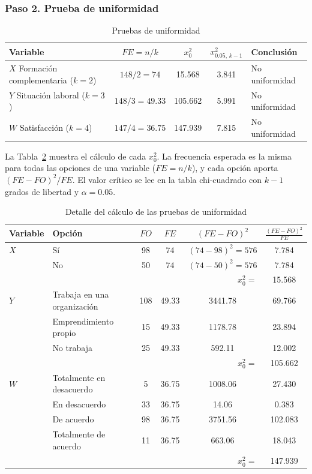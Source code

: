 \documentclass[12pt, a4paper]{article}
\newenvironment{mitabla}[2][H]{%
  \begin{table}[#1]
  \centering
  \caption{#2}
  \small
}{%
  \end{table}
}
\begin{document}
\subsubsection{Paso 2. Prueba de uniformidad}

\begin{mitabla}{Pruebas de uniformidad}\label{tab:real-uniformidad}
\begin{tabular}{lcccl}
\toprule
\textbf{Variable} & \textbf{$FE = n/k$} & \textbf{$x_0^2$} & \textbf{$x^2_{0.05,\,k-1}$} & \textbf{Conclusión} \\
\midrule
$X$ Formación complementaria ($k=2$) & $148/2 = 74$    & 15.568  & 3.841 & No uniformidad \\
$Y$ Situación laboral ($k=3$)        & $148/3 = 49.33$ & 105.662 & 5.991 & No uniformidad \\
$W$ Satisfacción ($k=4$)             & $147/4 = 36.75$ & 147.939 & 7.815 & No uniformidad \\
\bottomrule
\end{tabular}
\end{mitabla}

La Tabla~\ref{tab:real-unif-detalle} muestra el cálculo de cada
$x_0^2$. La frecuencia esperada es la misma para todas las opciones de una
variable ($FE = n/k$), y cada opción aporta $(FE - FO)^2/FE$. El valor
crítico se lee en la tabla chi-cuadrado con $k - 1$ grados de libertad y
$\alpha = 0.05$.

\begin{mitabla}{Detalle del cálculo de las pruebas de uniformidad}\label{tab:real-unif-detalle}
\begin{tabular}{llcccc}
\toprule
\textbf{Variable} & \textbf{Opción} & \textbf{$FO$} & \textbf{$FE$} & \textbf{$(FE-FO)^2$} & \textbf{$\frac{(FE-FO)^2}{FE}$} \\
\midrule
$X$ & Sí & 98 & 74 & $(74-98)^2 = 576$ & 7.784 \\
    & No & 50 & 74 & $(74-50)^2 = 576$ & 7.784 \\
    & \multicolumn{4}{r}{$x_0^2 =$} & 15.568 \\
\midrule
$Y$ & Trabaja en una organización & 108 & 49.33 & 3441.78 & 69.766 \\
    & Emprendimiento propio       & 15  & 49.33 & 1178.78 & 23.894 \\
    & No trabaja                  & 25  & 49.33 & 592.11  & 12.002 \\
    & \multicolumn{4}{r}{$x_0^2 =$} & 105.662 \\
\midrule
$W$ & Totalmente en desacuerdo & 5  & 36.75 & 1008.06 & 27.430 \\
    & En desacuerdo            & 33 & 36.75 & 14.06   & 0.383 \\
    & De acuerdo               & 98 & 36.75 & 3751.56 & 102.083 \\
    & Totalmente de acuerdo    & 11 & 36.75 & 663.06  & 18.043 \\
    & \multicolumn{4}{r}{$x_0^2 =$} & 147.939 \\
\bottomrule
\end{tabular}
\end{mitabla}
\end{document}

